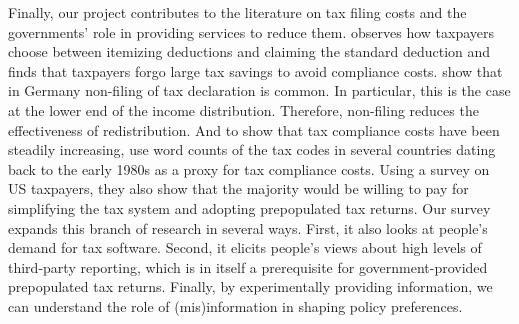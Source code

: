 \documentclass[12pt]{article}
\begin{document}
Finally, our project contributes to the literature on tax filing costs and the governments' role in providing services to reduce them. \textcite{benzarti2020taxing} observes how taxpayers choose between itemizing deductions and claiming the standard deduction and finds that taxpayers forgo large tax savings to avoid compliance costs. \textcite{hauck2024optional} show that in Germany non-filing of tax declaration is common. In particular, this is the case at the lower end of the income distribution. Therefore, non-filing reduces the effectiveness of redistribution. And to show that tax compliance costs have been steadily increasing, \textcite{benzarti2024rising} use word counts of the tax codes in several countries dating back to the early 1980s as a proxy for tax compliance costs. Using a survey on US taxpayers, they also show that the majority would be willing to pay for simplifying the tax system and adopting prepopulated tax returns. Our survey expands this branch of research in several ways. First, it also looks at people's demand for tax software. Second, it elicits people's views about high levels of third-party reporting, which is in itself a prerequisite for government-provided prepopulated tax returns. Finally, by experimentally providing information, we can understand the role of (mis)information in shaping policy preferences. 
\newpage
\printbibliography
\end{document}
